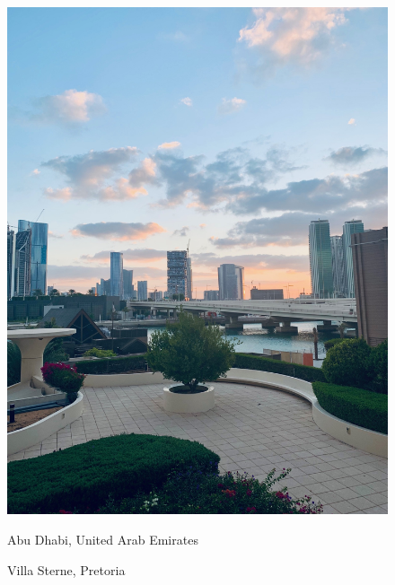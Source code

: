 \documentclass[
  letterpaper,
]{book}
\begin{document}
\begin{figure}
\begin{minipage}[t]{0.50\linewidth}
{{\includegraphics{AbuDhabi.jpg}

}

\caption{Abu Dhabi, United Arab Emirates}

}

\end{minipage}%
\newline
\begin{minipage}[t]{0.50\linewidth}

{\centering 


\caption{Villa Sterne, Pretoria}

}

\end{minipage}%
%
\begin{minipage}[t]{0.50\linewidth}

{\centering 

}
\end{minipage}
\end{figure}
\end{document}
